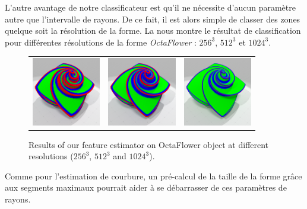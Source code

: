 %
L'autre avantage de notre classificateur est qu'il ne nécessite d'aucun
paramètre autre que l'intervalle de rayons. De ce fait, il est alors simple de
classer des zones quelque soit la résolution de la forme. La
 nous montre le résultat de classification pour
différentes résolutions de la forme \emph{OctaFlower} : $256^3$, $512^3$ et
$1024^3$.
%
\begin{figure}[ht]
  \begin{center}
    \setlength{\tabcolsep}{1pt}
    \begin{tabular}{c c c}
      \includegraphics[width=3cm]{images/Feature/OctaFlower_256_II_scale} &
      \includegraphics[width=3cm]{images/Feature/OctaFlower_512_II_scale} &
      \includegraphics[width=3cm]{images/Feature/OctaFlower_1024_II_scale}
    \end{tabular}
    \caption{Results of our feature estimator on OctaFlower object at different resolutions ($256^3$, $512^3$ and $1024^3$).\label{fig:feature-octa}}
  \end{center}
\end{figure}
%
Comme pour l'estimation de courbure, un pré-calcul de la taille de la forme
grâce aux segments maximaux pourrait aider à se débarrasser de ces paramètres de
rayons. 
%
